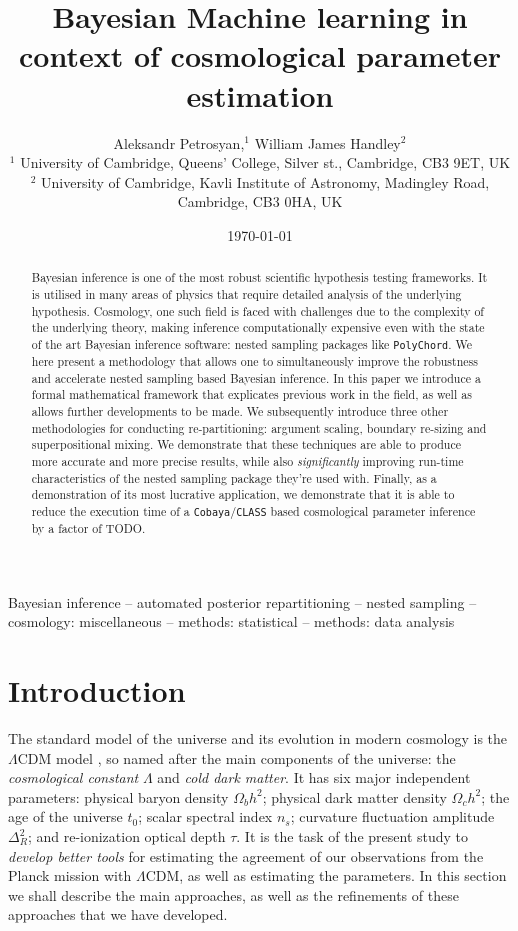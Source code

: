 \documentclass[usenatbib]{mnras}
\author[A. Petrosyan and W. J. Handley]{
  Aleksandr Petrosyan,$^{1}$
  William James Handley$^{2}$
  \\
  $^{1}$ University of Cambridge, Queens' College, Silver st., Cambridge, CB3 9ET, UK\\
  $^{2}$ University of Cambridge, Kavli Institute of Astronomy, Madingley Road, Cambridge, CB3 0HA, UK 
}
\date{\today}
\title[Stochastic posterior re-partitioning]{Bayesian Machine learning in context of cosmological parameter estimation}
\begin{document}
\maketitle
\begin{abstract}
Bayesian inference is one of the most robust scientific hypothesis testing frameworks. It is utilised in many areas of physics that require detailed analysis of the underlying hypothesis. Cosmology, one such field is faced with challenges due to the complexity of the underlying theory, making inference computationally expensive even with the state of the art Bayesian inference software:  nested sampling packages like \texttt{PolyChord}. We here present a methodology that allows one to simultaneously improve the robustness and accelerate nested sampling based Bayesian inference. In this paper we introduce a formal mathematical framework that explicates previous work in the field, as well as allows further developments to be made. We subsequently introduce three other methodologies for conducting re-partitioning: argument scaling, boundary re-sizing and superpositional mixing. We demonstrate that these techniques are able to produce more accurate and more precise results, while also \emph{significantly} improving run-time characteristics of the nested sampling package they're used with. Finally, as a demonstration of its most lucrative application, we demonstrate that it is able to reduce the execution time of a \texttt{Cobaya}/\texttt{CLASS} based cosmological parameter inference by a factor of TODO. 

\end{abstract}

\begin{keywords}
Bayesian inference -- automated posterior repartitioning -- nested sampling -- cosmology: miscellaneous -- methods: statistical -- methods: data analysis
\end{keywords}

\section{Introduction}\label{sec:org14413d7}

The standard model of the universe and its evolution in modern
cosmology is the \(\Lambda\)CDM model \citep{Condon2018}, so named
after the main components of the universe: the \emph{cosmological constant} \(\Lambda\)
and \emph{cold dark matter}. It has six major independent parameters:
physical baryon density \(\Omega_{b}h^{2}\); physical dark matter
density \(\Omega_{c}h^{2}\); the age of the universe \(t_{0}\); scalar
spectral index \(n_{s}\); curvature fluctuation amplitude
\(\Delta_{R}^{2}\); and re-ionization optical depth \(\tau\). It is the
task of the present study to \emph{develop better tools} for estimating
the agreement of our observations from the Planck mission with
\(\Lambda\)CDM, as well as estimating the parameters. In this
section we shall describe the main approaches, as well as the
refinements of these approaches that we have developed.
\end{document}
